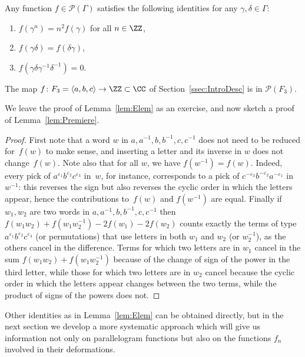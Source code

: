 \begin{lemma}\label{lem:Elem}
Any function $f\!\in\!\mathcal{P}(\Gamma)$ satisfies the following
identities for any $\gamma,\delta\!\in\!\Gamma$:
\begin{enumerate}
\item $f(\gamma^n)=n^2f(\gamma)$ for all $n\in \ZZ$,
\item $f(\gamma\delta)=f(\delta\gamma)$,
\item $f(\gamma\delta\gamma^{-1}\delta^{-1})=0$.
\end{enumerate}
\end{lemma}
\begin{lemma}\label{lem:Premiere}
The map $f\colon F_3=\langle a,b,c\rangle\to\ZZ\subset\CC$
of Section~\ref{ssec:IntroDesc} is in $\mathcal{P}(F_3)$.
\end{lemma}
We leave the proof of Lemma~\ref{lem:Elem} as an exercise, and now sketch
a proof of Lemma~\ref{lem:Premiere}.
\begin{proof}
First note that a word $w$ in $a,a^{-1},b,b^{-1},c,c^{-1}$ does not need
to be reduced for~$f(w)$ to make sense, and inserting a letter and its inverse
in $w$ does not change~$f(w)$. Note also that for all $w$, we have
$f(w^{-1})=f(w)$. Indeed, every pick of
$a^{\varepsilon_1}b^{\varepsilon_2}c^{\varepsilon_3}$ in~$w$, for instance,
corresponds to a pick of $c^{-\varepsilon_3}b^{-\varepsilon_2}a^{-\varepsilon_1}$
in $w^{-1}$: this reverses the sign but also reverses the cyclic order in
which the letters appear, hence the contributions to~$f(w)$ and $f(w^{-1})$
are equal. Finally if $w_1,w_2$ are two words in $a,a^{-1},b,b^{-1},c,c^{-1}$
then $f(w_1w_2)+f(w_1w_2^{-1})-2f(w_1)-2f(w_2)$ counts exactly the
terms of type $a^{\varepsilon_1}b^{\varepsilon_2}c^{\varepsilon_3}$
(or permutations) that use letters in both $w_1$ and $w_2$ (or $w_2^{-1}$),
as the others cancel in the difference. Terms for which two letters are
in $w_1$ cancel in the sum $f(w_1w_2)+f(w_1w_2^{-1})$ because of the change
of sign of the power in the third letter, while those for which two letters
are in $w_2$ cancel because the cyclic order in which the letters appear
changes between the two terms, while the product of signs of the powers
does not.
\end{proof}

Other identities as in Lemma~\ref{lem:Elem} can be obtained directly,
but in the next section we develop a more systematic approach which
will give us information not only on parallelogram functions but also on the
functions $f_n$ involved in their deformations.

